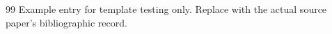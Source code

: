 \clearpage
\renewcommand{\refname}{参考文献}
\begin{thebibliography}{99}
 Example entry for template testing only. Replace with the actual source paper's bibliographic record.
\end{thebibliography}
